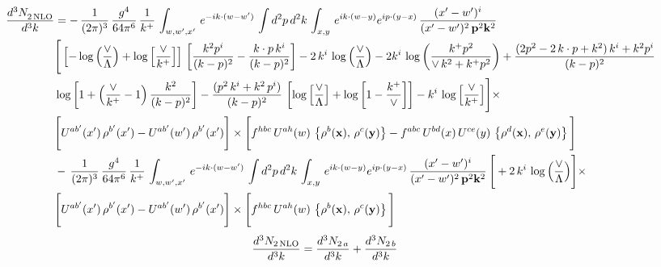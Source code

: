 \documentclass[9pt]{article}
\numberwithin{equation}{section}
\begin{document}
\begin{align}
   \frac{d^{3}N_{2\,\rm NLO}^{\rm}}{d^{3}k} &  = -\,\frac{1}{(2\pi)^{3}}\,\frac{g^{4}}{64\pi^{6}}\, \frac{1}{k^{+}}\,\int_{w,w',x'}\, e^{-ik\cdot (w-w')}\,\int d^{2}p\,d^{2}k\,\int_{x,y}\, e^{ik\cdot (w-y)} e^{ip\cdot (y-x)}\, \frac{(x'-w')^{i}}{(x'-w')^{2}\,\mathbf{p}^{2}\mathbf{k}^{2} }\notag \\ & \Bigg[\left[-\log{\left(\frac{\vee}{\Lambda}\right)}+\log{\left[\frac{\vee}{k^{+}}\right]}\right]\,\left[\frac{k^{2}p^{i}}{(k-p)^{2}}-\frac{k\cdot p\,k^{i}}{(k-p)^{2}}\right]-2\,k^{i}\,\log{\left(\frac{\vee}{\Lambda}\right)} -2k^{i}\,\log{\left(\frac{k^{+}p^{2}}{\vee\, k^{2}+k^{+}p^{2}}\right)}+\frac{(2p^{2}-2\,k\cdot p + k^{2})\,k^{i} + k^{2}p^{i}}{(k-p)^{2}}\notag \\ &  \log{\left[1+\left(\frac{\vee}{k^{+}}-1\right)\frac{k^{2}}{(k-p)^{2}}\right]} - \frac{(p^{2}\,k^{i}+k^{2}\,p^{i})}{(k-p)^{2}}\,\left[\log{\left[\frac{\vee}{\Lambda}\right]}+\log{\left[1-\frac{k^{+}}{\vee}\right]}\right]-k^{i}\,\log{\left[\frac{\vee}{k^{+}}\right]}\Bigg]\times\,\notag \\ &  \Bigg[U^{ab'}(x')\,\rho^{b'}(x') - U^{ab'}(w')\,\rho^{b'}(x')\Bigg]\times\Bigg[f^{hbc}\,U^{ah}(w)\,\left\{ \rho^{b}(\mathbf{x}),\,\rho^{c}(\mathbf{y})\right\}-f^{abc}\,U^{bd}(x)\, U^{ce}(y)\, \left\{\rho^{d}(\mathbf{x}),\,\rho^{e}(\mathbf{y})\right\}\Bigg] \notag \\ & -\,\frac{1}{(2\pi)^{3}}\,\frac{g^{4}}{64\pi^{6}}\, \frac{1}{k^{+}}\,\int_{w,w^{\prime},x^{\prime}}\, e^{-ik\cdot (w-w^{\prime})}\,\int d^{2}p\,d^{2}k\,\int_{x,y}\, e^{ik\cdot (w-y)} e^{ip\cdot (y-x)}\, \frac{(x^{\prime}-w^{\prime})^{i}}{(x^{\prime}-w^{\prime})^{2}\,\mathbf{p}^{2}\mathbf{k}^{2} }\,\Bigg[+2\,k^{i}\,\log{\left(\frac{\vee}{\Lambda}\right)}\Bigg]\times \notag \\ & \Bigg[U^{ab^{\prime}}(x^{\prime})\,\rho^{b^{\prime}}(x^{\prime}) - U^{ab^{\prime}}(w^{\prime})\,\rho^{b^{\prime}}(x^{\prime})\Bigg]\times\Bigg[f^{hbc}\,U^{ah}(w)\,\left\{ \rho^{b}(\mathbf{x}),\,\rho^{c}(\mathbf{y})\right\}\Bigg]
\end{align}
\begin{align}
\frac{d^{3}N_{2\,\rm NLO}}{d^{3}k} &= \frac{d^{3}N_{2\,a}}{d^{3}k} + \frac{d^{3}N_{2\,b}}{d^{3}k}
\end{align}
\end{document}

